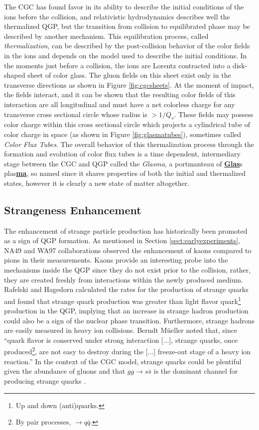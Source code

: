 The CGC has found favor in its ability to describe the initial conditions of the ions before the collision, and relativistic hydrodynamics describes well the thermalized QGP, but the transition from collision to equilibrated phase may be described by another mechanism. This equilibration process, called \textit{thermalization}, can be described by the post-collision behavior of the color fields in the ions \citep{Fujii:2008dd} and depends on the model used to describe the initial conditions. In the moments just before a collision, the ions are Lorentz contracted into a disk-shaped sheet of color glass. The gluon fields on this sheet exist only in the transverse directions as shown in Figure \ref{fig:cgcsheets}. At the moment of impact, the fields interact, and it can be shown \citep{Fries:2006pv} that the resulting color fields of this interaction are all longitudinal and must have a net colorless charge for any transverse cross sectional circle whose radius is $> 1/Q_s$. These fields may possess color charge within this cross sectional circle which projects a cylindrical tube of color charge in space (as shown in Figure \ref{fig:glasmatubes}), sometimes called \textit{Color Flux Tubes}. The overall behavior of this thermalization process through the formation and evolution of color flux tubes is a time dependent, intermediary stage between the CGC and QGP called the \textit{Glasma}, a portmanteau of \underline{\textbf{Glas}}s plas\underline{\textbf{ma}}, so named since it shares properties of both the initial and thermalized states, however it is clearly a new state of matter altogether.

\subsection{Strangeness Enhancement}
The enhancement of strange particle production has historically been promoted as a sign of QGP formation. As mentioned in Section \ref{sect:earlyexperiments}, NA49 and WA97 collaborations observed the enhancement of kaons compared to pions in their measurements. Kaons provide an interesting probe into the mechanisms inside the QGP since they do not exist prior to the collision, rather, they are created freshly from interactions within the newly produced medium. Rafelski and Hagedorn calculated the rates for the production of strange quarks\citep{statmechofquarks} and found that strange quark production was greater than light flavor quark\footnote{Up and down (anti)quarks.} production in the QGP, implying that an increase in strange hadron production could also be a sign of the nuclear phase transition. Furthermore, strange hadrons are easily measured in heavy ion collisions. Berndt M\"ueller noted that, since ``quark flavor is conserved under strong interaction [...], strange quarks, once produced\footnote{By pair processes, $\rightarrow q\bar{q}$.}, are not easy to destroy during the [...] freeze-out stage of a heavy ion reaction.'' \citep{Muller:2011tu} In the context of the CGC model, strange quarks could be plentiful given the abundance of gluons and that $gg \rightarrow s \bar{s}$ is the dominant channel for producing strange quarks \citep{PhysRevLett.48.1066}.

